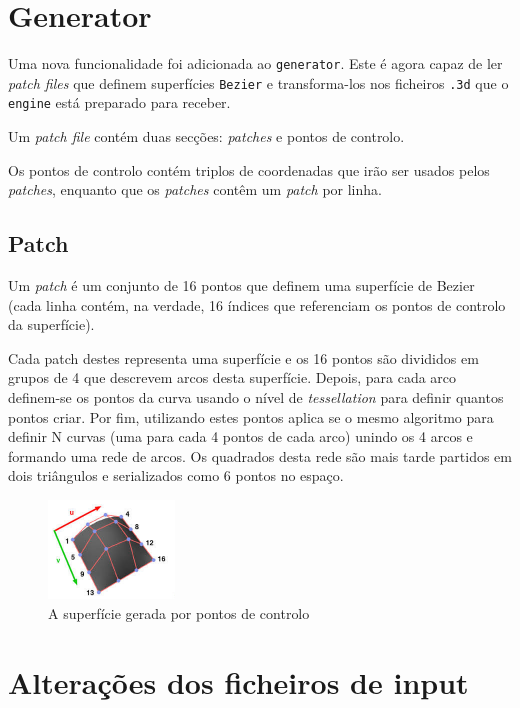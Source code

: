 \documentclass[a4paper]{article}
\begin{document}
\section{Generator}

Uma nova funcionalidade foi adicionada ao \texttt{generator}. Este é agora capaz de ler \textit{patch files} que definem superfícies \texttt{Bezier} e transforma-los nos ficheiros \texttt{.3d} que o \texttt{engine} está preparado para receber.

Um \textit{patch file} contém duas secções: \textit{patches} e pontos de controlo.

Os pontos de controlo contém triplos de coordenadas que irão ser usados pelos \textit{patches}, enquanto que os \textit{patches} contêm um \textit{patch} por linha.

\subsection{Patch}

Um \textit{patch} é um conjunto de 16 pontos que definem uma superfície de Bezier (cada linha contém, na verdade, 16 índices que referenciam os pontos de controlo da superfície).

Cada patch destes representa uma superfície e os 16 pontos são divididos em grupos de 4 que descrevem arcos desta superfície. Depois, para cada arco definem-se os pontos da curva usando o nível de \textit{tessellation} para definir quantos pontos criar. Por fim, utilizando estes pontos aplica se o mesmo algoritmo para definir N curvas (uma para cada 4 pontos de cada arco) unindo os 4 arcos e formando uma rede de arcos. Os quadrados desta rede são mais tarde partidos em dois triângulos e serializados como 6 pontos no espaço.

\begin{figure}[H]
    \centering
    \includegraphics[width=0.3\textwidth]{bezier.jpg}
    \caption{A superfície gerada por pontos de controlo}
\end{figure}

\section{Alterações dos ficheiros de input}\label{sec:estrutura-ficheiros}
\end{document}
